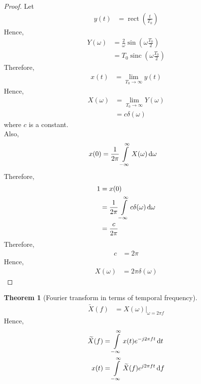 \documentclass[titlepage, fleqn, a4paper, 12pt, twoside]{article}
\theoremstyle{definition}
\theoremstyle{theorem}
\newtheorem{theorem}{Theorem}
\renewcommand{\tilde}{\widetilde}
\DeclareMathOperator{\sinc}{\mathrm{sinc}}
\DeclareMathOperator{\rect}{\mathrm{rect}}
\begin{document}
\begin{proof}
	Let
	\begin{align*}
		y(t) &= \rect\left( \frac{t}{T_0} \right)
	\end{align*}
	Hence,
	\begin{align*}
		Y(\omega) &= \frac{2}{\omega} \sin\left( \omega \frac{T_0}{2} \right)\\
		&= T_0 \sinc\left( \omega \frac{T_0}{2} \right)
	\end{align*}
	Therefore,
	\begin{align*}
		x(t) &= \lim\limits_{T_0 \to \infty} y(t)
	\end{align*}
	Hence,
	\begin{align*}
		X(\omega) &= \lim\limits_{T_0 \to \infty} Y(\omega)\\
		&= c \delta(\omega)
	\end{align*}
	where $c$ is a constant.\\
	Also,
	\begin{align*}
		x(0) &= \frac{1}{2 \pi} \int\limits_{-\infty}^{\infty} X(\omega) \dif \omega
	\end{align*}
	Therefore,
	\begin{align*}
		1 &= x(0)\\
		&= \frac{1}{2 \pi} \int\limits_{-\infty}^{\infty} c \delta(\omega) \dif \omega\\
		&= \frac{c}{2 \pi}
	\end{align*}
	Therefore,
	\begin{align*}
		c &= 2 \pi
	\end{align*}
	Hence,
	\begin{align*}
		X(\omega) &= 2 \pi \delta(\omega)
	\end{align*}
\end{proof}

\begin{theorem}[Fourier transform in terms of temporal frequency]
	\begin{align*}
		\tilde{X}(f) &= X(\omega) \Big|_{\omega = 2 \pi f}
	\end{align*}
	Hence,
	\begin{align*}
		\tilde{X}(f) &= \int\limits_{-\infty}^{\infty} x(t) e^{-j 2 \pi f t} \dif t\\
		x(t) &= \int\limits_{-\infty}^{\infty} \tilde{X}(f) e^{j 2 \pi f t} \dif f
	\end{align*}
	\label{thm:Fourier_transform_in_terms_of_temporal_frequency}
\end{theorem}
\end{document}
